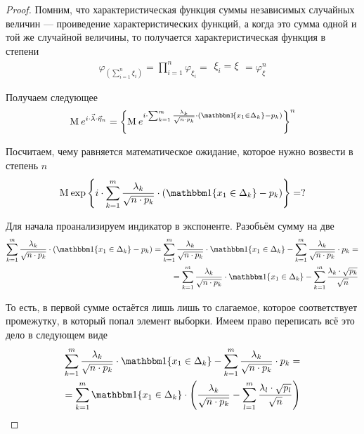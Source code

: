 \begin{proof}
    Помним, что характеристическая функция суммы независимых случайных величин
    --- проиведение характеристических функций, а когда это сумма одной и той же
    случайной величины, то получается характеристическая функция в степени
    \begin{align*}
        \varphi_{\left( \sum_{i=1}^n \xi_i \right)}
        = \prod_{i=1}^n{\varphi_{\xi_i}}
        = \begin{array}{|c|}
            \xi_i = \xi
        \end{array}
        = \varphi_{\xi}^n
    \end{align*}

    Получаем следующее
    \begin{align*}
        \mean{e^{i \cdot \vec{\lambda} \cdot \vec{\eta}_n}}
        = \left\{ \mean{e^{i \cdot \sum_{k=1}^{m}\frac{\lambda_k}{
                \sqrt{n \cdot p_k}} \cdot \left(
                \Indicator{x_1 \in \Delta_k} - p_k \right)}} \right\}^n
    \end{align*}

    Посчитаем, чему равняется математическое ожидание, которое нужно возвести
    в степень $n$
    \begin{equation}\label{eq:criteriaPirson:meanPowerable}
        \mean{\exp{\left\{ i \cdot \sum_{k=1}^{m}\frac{\lambda_k}{
                \sqrt{n \cdot p_k}} \cdot \left(
                \Indicator{x_1 \in \Delta_k} - p_k \right) \right\}}} = ?
    \end{equation}

    Для начала проанализируем индикатор в экспоненте.
    Разобьём сумму на две
    \begin{align*}
        \sum_{k=1}^{m}\frac{\lambda_k}{\sqrt{n \cdot p_k}} \cdot \left(
                \Indicator{x_1 \in \Delta_k} - p_k \right)
        = \sum_{k=1}^{m}\frac{\lambda_k}{\sqrt{n \cdot p_k}}
                \cdot \Indicator{x_1 \in \Delta_k}
            - \sum_{k=1}^{m}\frac{\lambda_k}{\sqrt{n \cdot p_k}} \cdot p_k = \\
        = \sum_{k=1}^{m}\frac{\lambda_k}{\sqrt{n \cdot p_k}}
                \cdot \Indicator{x_1 \in \Delta_k}
            - \sum_{k=1}^{m}\frac{\lambda_k \cdot \sqrt{p_k}}{\sqrt{n}}
    \end{align*}

    То есть, в первой сумме остаётся лишь лишь то слагаемое, которое
    соответствует промежутку, в который попал элемент выборки. Имеем право
    переписать всё это дело в следующем виде
    \begin{align*}
        \sum_{k=1}^{m}\frac{\lambda_k}{\sqrt{n \cdot p_k}}
                \cdot \Indicator{x_1 \in \Delta_k}
            - \sum_{k=1}^{m}\frac{\lambda_k}{\sqrt{n \cdot p_k}} \cdot p_k = \\
        = \sum_{k=1}^{m} \Indicator{x_1 \in \Delta_k} \cdot \left(
            \frac{\lambda_k}{\sqrt{n \cdot p_k}} - \sum_{l=1}^{m}
                \frac{\lambda_l \cdot \sqrt{p_l}}{\sqrt{n}} \right)
    \end{align*}


\end{proof}
